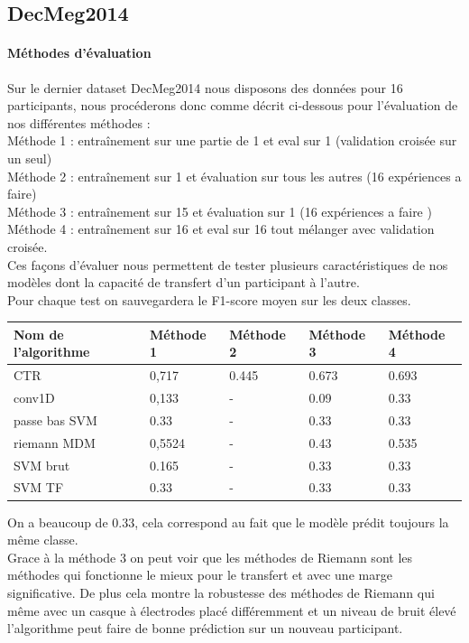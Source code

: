 \documentclass{article}[12pt]
\begin{document}
\subsection{DecMeg2014}

\paragraph{Méthodes d'évaluation}

Sur le dernier dataset DecMeg2014 nous disposons des données pour 16 participants, nous procéderons donc comme décrit ci-dessous pour l'évaluation de nos différentes méthodes :\\
Méthode 1 : entraînement sur une partie de 1 et eval sur 1 (validation croisée sur un seul)\\
Méthode 2 : entraînement sur 1 et évaluation sur tous les autres (16 expériences a faire)\\
Méthode 3 : entraînement sur 15 et évaluation sur 1 (16 expériences a faire )\\
Méthode 4 : entraînement sur 16 et eval sur 16 tout mélanger avec validation croisée.
\\
Ces façons d'évaluer nous permettent de tester plusieurs caractéristiques de nos modèles dont la capacité de transfert d'un participant à l'autre.
\\
Pour chaque test on sauvegardera le F1-score moyen sur les deux classes.
\\

\begin{table}[H]
\begin{center}
\begin{tabular}{|l|l|l|l|l|}
\hline
Nom de l’algorithme & Méthode 1         & Méthode 2           & Méthode 3          & Méthode 4          \\
\hline
CTR                 & 0,717 & 0.445 & 0.673 & 0.693 \\
conv1D              & 0,133         & - & 0.09               & 0.33               \\
passe bas SVM       & 0.33                & - & 0.33                  & 0.33                  \\
riemann MDM         & 0,5524            & -                & 0.43               & 0.535               \\
SVM brut            & 0.165                 & - & 0.33                  & 0.33                  \\
SVM TF              & 0.33                 & - & 0.33                  & 0.33      \\
\hline           
\end{tabular}
\end{center}
\end{table}
On a beaucoup de 0.33, cela correspond au fait que le modèle prédit toujours la même classe. \\
Grace à la méthode 3 on peut voir que les méthodes de Riemann sont les méthodes qui fonctionne le mieux pour le transfert et avec une marge significative. De plus cela montre la robustesse des méthodes de Riemann qui même avec un casque à électrodes placé différemment et un niveau de bruit élevé l'algorithme peut faire de bonne prédiction sur un nouveau participant.
\end{document}

